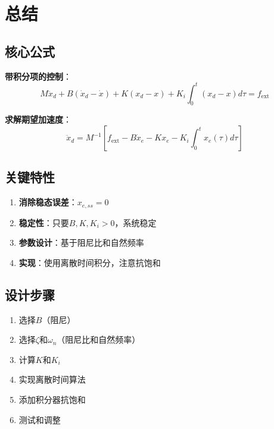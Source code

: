 \documentclass[12pt,a4paper]{article}
\begin{document}
\section{总结}

\subsection{核心公式}

\textbf{带积分项的控制}：
\begin{equation}
M\ddot{x}_d + B(\dot{x}_d - \dot{x}) + K(x_d - x) + K_i \int_0^t (x_d - x) d\tau = f_{\text{ext}}
\end{equation}

\textbf{求解期望加速度}：
\begin{equation}
\ddot{x}_d = M^{-1}\left[f_{\text{ext}} - B\dot{x}_e - Kx_e - K_i \int_0^t x_e(\tau) d\tau\right]
\end{equation}

\subsection{关键特性}

\begin{enumerate}
\item \textbf{消除稳态误差}：$x_{e,ss} = 0$
\item \textbf{稳定性}：只要$B, K, K_i > 0$，系统稳定
\item \textbf{参数设计}：基于阻尼比和自然频率
\item \textbf{实现}：使用离散时间积分，注意抗饱和
\end{enumerate}

\subsection{设计步骤}

\begin{enumerate}
\item 选择$B$（阻尼）
\item 选择$\zeta$和$\omega_n$（阻尼比和自然频率）
\item 计算$K$和$K_i$
\item 实现离散时间算法
\item 添加积分器抗饱和
\item 测试和调整
\end{enumerate}
\end{document}
